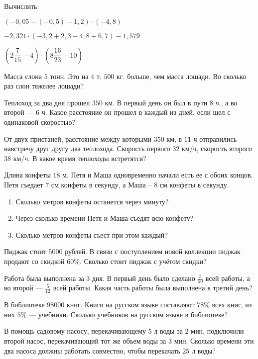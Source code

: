 \begin{listofex}
	\item Вычислить:
	\begin{enumcols}[itemcolumns=2]
		\item \( (-0,05-(-0,5)-1,2)\cdot(-4,8) \)
		\item \( -2,321\cdot(-3,2+2,3-4,8+6,7)-1,579 \)
		\item \( \left( 2\dfrac{7}{15}-4 \right)\cdot\left( 8\dfrac{16}{23}-10 \right) \)
	\end{enumcols}
	\item Масса слона \( 5 \) тонн. Это на \( 4 \) т. \( 500 \) кг. больше, чем масса лошади. Во сколько раз слон тяжелее лошади?
	\item Теплоход за два дня прошел \( 350 \) км. В первый день он был в пути \( 8 \) ч., а во второй --- \( 6 \) ч. Какое расстояние он прошел в каждый из дней, если шел с одинаковой скоростью?
	\item От двух пристаней, расстояние между которыми \( 350 \) км, в \( 11 \) ч отправились навстречу друг другу два теплохода. Скорость первого \( 32 \) км/ч, скорость второго \( 38 \) км/ч. В какое время теплоходы встретятся?
	\item Длина конфеты \( 18 \) м. Петя и Маша одновременно начали есть ее с обоих концов. Петя съедает \( 7 \) см конфеты в секунду, а Маша – \( 8 \) см конфеты в секунду.
	\begin{enumerate}[label=\asbuk*), labelsep=0.5em]
		\item Сколько метров конфеты останется через минуту?
		\item Через сколько времени Петя и Маша съедят всю конфету?
		\item Сколько метров конфеты съест при этом каждый?
	\end{enumerate}
	\item Пиджак стоит \( 5000 \) рублей. В связи с поступлением новой коллекции пиджак продают со скидкой \( 60\% \). Сколько стоит пиджак с учётом скидки?
	\item Работа была выполнена за \( 3 \) дня. В первый день было сделано \( \frac{3}{20} \) всей работы, а во второй --- \( \frac{5}{12} \) всей работы. Какая часть работы была выполнена в третий день?
	\item В библиотеке \( 98000 \) книг. Книги на русском языке составляют \( 78\% \) всех книг, из них \( 5\% \) --- учебники. Сколько учебников на русском языке в библиотеке?
	\item В помощь садовому насосу, перекачивающему \( 5 \) л воды за \( 2 \) мин, подключили второй насос, перекачивающий тот же объем воды за \( 3 \) мин. Сколько времени эти два насоса должны работать совместно, чтобы перекачать \( 25 \) л воды?
\end{listofex}